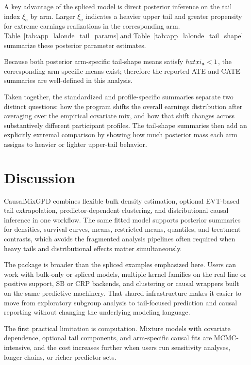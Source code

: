 \documentclass[article]{jss}\usepackage[]{graphicx}\usepackage[]{xcolor}
\DeclareRobustCommand{\pkg}[1]{\textsf{#1}}
\begin{document}
A key advantage of the spliced model is direct posterior inference on
the tail index $\xi_a$ by arm. Larger $\xi_a$ indicates a heavier upper
tail and greater propensity for extreme earnings realizations in the
corresponding arm. Table~\ref{tab:app_lalonde_tail_params} and
Table~\ref{tab:app_lalonde_tail_shape} summarize these posterior
parameter estimates.

Because both posterior arm-specific tail-shape means satisfy $\\hat\\xi_a < 1$, the corresponding arm-specific means exist; therefore the reported ATE and CATE summaries are well-defined in this analysis.

Taken together, the standardized and profile-specific summaries separate
two distinct questions: how the program shifts the overall earnings
distribution after averaging over the empirical covariate mix, and how
that shift changes across substantively different participant profiles.
The tail-shape summaries then add an explicitly extremal comparison by
showing how much posterior mass each arm assigns to heavier or lighter
upper-tail behavior.


\section{Discussion}
\label{sec:discussion}

\pkg{CausalMixGPD} combines flexible bulk density estimation, optional
EVT-based tail extrapolation, predictor-dependent clustering, and
distributional causal inference in one workflow. The same fitted model
supports posterior summaries for densities, survival curves, means,
restricted means, quantiles, and treatment contrasts, which avoids the
fragmented analysis pipelines often required when heavy tails and
distributional effects matter simultaneously.

The package is broader than the spliced examples emphasized here. Users
can work with bulk-only or spliced models, multiple kernel families on
the real line or positive support, SB or CRP backends, and clustering or
causal wrappers built on the same predictive machinery. That shared
infrastructure makes it easier to move from exploratory subgroup
analysis to tail-focused prediction and causal reporting without
changing the underlying modeling language.

The first practical limitation is computation. Mixture models with
covariate dependence, optional tail components, and arm-specific causal
fits are MCMC-intensive, and the cost increases further when users run
sensitivity analyses, longer chains, or richer predictor sets.
\end{document}
